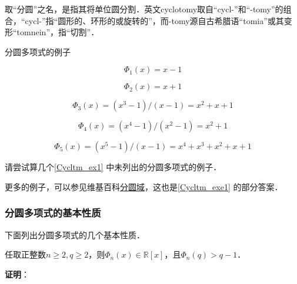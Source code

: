 取“分圆”之名，是指其将单位圆分割．英文cyclotomy取自“cycl-”和“-tomy”的组合，“cycl-”指“圆形的、环形的或旋转的”，而-tomy源自古希腊语“tomia”或其变形“tomnein”，指“切割”．




\begin{example}{分圆多项式的例子}\label{Cycltm_ex1}

\begin{equation}
\Phi_1(x) = x-1
\end{equation}

\begin{equation}\label{Cycltm_eq2}
\Phi_2(x) = x+1
\end{equation}

\begin{equation}
\Phi_3(x) = (x^3-1)/(x-1) = x^2+x+1
\end{equation}

\begin{equation}
\Phi_4(x) = (x^4-1)/(x^2-1) = x^2+1
\end{equation}

\begin{equation}
\Phi_5(x) = (x^5-1)/(x-1) = x^4+x^3+x^2+x+1
\end{equation}


\end{example}

\begin{exercise}{}\label{Cycltm_exe1}
请尝试算几个\autoref{Cycltm_ex1} 中未列出的分圆多项式的例子．
\end{exercise}

更多的例子，可以参见维基百科\href{https://en.wikipedia.org/wiki/Cyclotomic_polynomial#Examples}{分圆域}，这也是\autoref{Cycltm_exe1} 的部分答案．





\subsubsection{分圆多项式的基本性质}


下面列出分圆多项式的几个基本性质．

\begin{theorem}{}
任取正整数$n\geq 2, q\geq 2$，则$\Phi_n(x)\in\mathbb{R}[x]$，且$\Phi_n(q)>q-1$．
\end{theorem}

\textbf{证明}：

